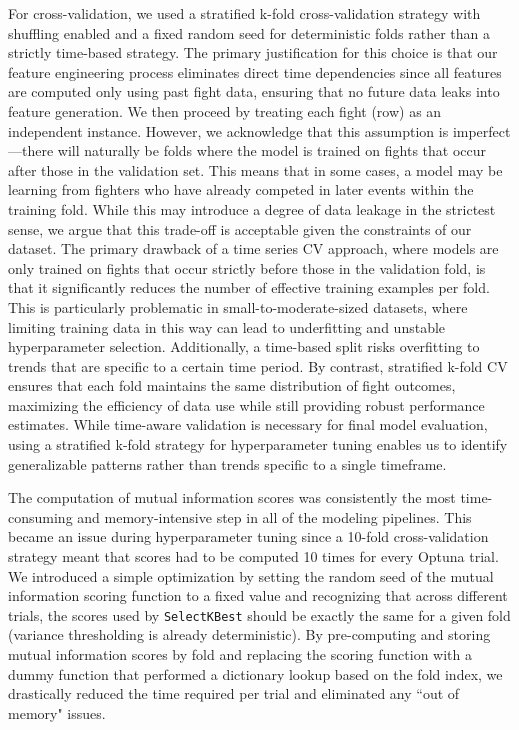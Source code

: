 \documentclass[12pt,twoside]{report}
\begin{document}
For cross-validation, we used a stratified k-fold cross-validation strategy with shuffling enabled and a fixed random seed for deterministic folds rather than a strictly time-based strategy. The primary justification for this choice is that our feature engineering process eliminates direct time dependencies since all features are computed only using past fight data, ensuring that no future data leaks into feature generation. We then proceed by treating each fight (row) as an independent instance. However, we acknowledge that this assumption is imperfect---there will naturally be folds where the model is trained on fights that occur after those in the validation set. This means that in some cases, a model may be learning from fighters who have already competed in later events within the training fold. While this may introduce a degree of data leakage in the strictest sense, we argue that this trade-off is acceptable given the constraints of our dataset. The primary drawback of a time series CV approach, where models are only trained on fights that occur strictly before those in the validation fold, is that it significantly reduces the number of effective training examples per fold. This is particularly problematic in small-to-moderate-sized datasets, where limiting training data in this way can lead to underfitting and unstable hyperparameter selection. Additionally, a time-based split risks overfitting to trends that are specific to a certain time period. By contrast, stratified k-fold CV ensures that each fold maintains the same distribution of fight outcomes, maximizing the efficiency of data use while still providing robust performance estimates. While time-aware validation is necessary for final model evaluation, using a stratified k-fold strategy for hyperparameter tuning enables us to identify generalizable patterns rather than trends specific to a single timeframe.

The computation of mutual information scores was consistently the most time-consuming and memory-intensive step in all of the modeling pipelines. This became an issue during hyperparameter tuning since a 10-fold cross-validation strategy meant that scores had to be computed 10 times for every Optuna trial. We introduced a simple optimization by setting the random seed of the mutual information scoring function to a fixed value and recognizing that across different trials, the scores used by \texttt{SelectKBest} should be exactly the same for a given fold (variance thresholding is already deterministic). By pre-computing and storing mutual information scores by fold and replacing the scoring function with a dummy function that performed a dictionary lookup based on the fold index, we drastically reduced the time required per trial and eliminated any ``out of memory" issues.
\end{document}
